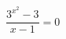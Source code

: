 \begin{ex}[type=equation]
	\begin{condition}
		\( \dfrac{3^{x^2}-3}{x-1}=0 \)
	\end{condition}
\end{ex}